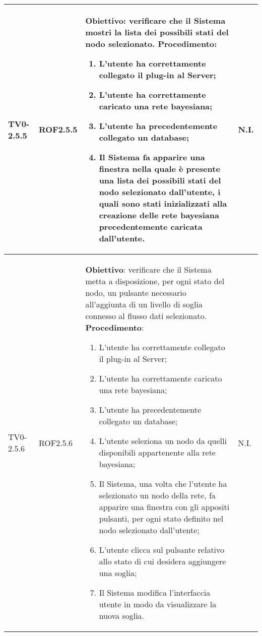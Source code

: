 \begin{longtable}{|C{.15\textwidth}|C{.13\textwidth}|m{.65\textwidth}|C{.08\textwidth}|}
TV0-2.5.5 & ROF2.5.5 &
	\textbf{Obiettivo}: verificare che il Sistema mostri la lista dei possibili stati del nodo selezionato. \newline
	\textbf{Procedimento}:
	\begin{enumerate}
		\item L'utente ha correttamente collegato il plug-in al Server;
		\item L'utente ha correttamente caricato una rete bayesiana;
		\item L'utente ha precedentemente collegato un database;
		\item Il Sistema fa apparire una finestra nella quale è presente   una lista dei possibili stati del nodo selezionato dall'utente, i quali sono stati inizializzati alla creazione delle rete bayesiana precedentemente caricata dall'utente.
	\end{enumerate}
	& N.I. \\
\hline

TV0-2.5.6 & ROF2.5.6 &
	\textbf{Obiettivo}: verificare che il Sistema metta a disposizione, per ogni stato del nodo, un pulsante necessario all'aggiunta di un livello di soglia connesso al flusso dati selezionato. \newline
	\textbf{Procedimento}:
	\begin{enumerate}
		\item L'utente ha correttamente collegato il plug-in al Server;
		\item L'utente ha correttamente caricato una rete bayesiana;
		\item L'utente ha precedentemente collegato un database;
		\item L'utente seleziona un nodo da quelli disponibili appartenente alla rete bayesiana;
		\item Il Sistema, una volta che l'utente ha selezionato un nodo della rete, fa apparire una finestra con gli appositi pulsanti, per ogni stato definito nel nodo selezionato dall'utente;
		\item L'utente clicca sul pulsante relativo allo stato di cui desidera aggiungere una soglia;
		\item Il Sistema modifica l'interfaccia utente in modo da visualizzare la nuova soglia.
	\end{enumerate}
	& N.I. \\
\hline


\end{longtable}
